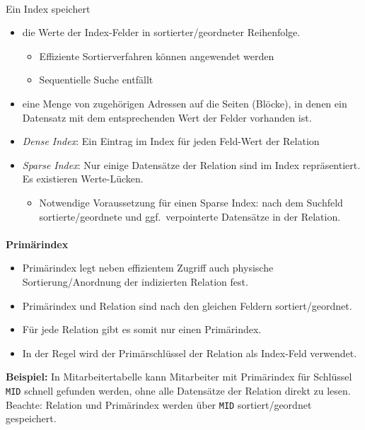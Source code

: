 \begin{frame}[label=sparsedense]{\insertsection}
\framesubtitle{\insertsubsection}
\abs
Ein Index speichert
\begin{itemize}
	\item die Werte der Index-Felder in sortierter/geordneter Reihenfolge.
	\begin{itemize}
		\item Effiziente Sortierverfahren können angewendet werden
		\item Sequentielle Suche entfällt
	\end{itemize}
	\item eine Menge von zugeh\"origen Adressen auf die Seiten (Bl\"ocke), in denen ein Datensatz mit dem entsprechenden Wert 
	der Felder vorhanden ist. 
\end{itemize}
\pause
{}
\begin{itemize}
	\item \textit{Dense Index}: Ein Eintrag im Index f\"ur jeden Feld-Wert der Relation
	\item \textit{Sparse Index}: Nur einige Datens\"atze der Relation sind im Index repr\"asentiert. Es existieren Werte-L\"ucken. 
	\begin{itemize}
		\item Notwendige Voraussetzung für einen Sparse Index: nach dem Suchfeld sortierte/geordnete und ggf.~verpointerte Datens\"atze in der
		Relation.
	\end{itemize}
\end{itemize}
\end{frame}

\begin{frame}{\insertsection}
\framesubtitle{\insertsubsection}	
\abs
\textbf{Prim\"arindex}
\begin{itemize}
	\item Prim\"arindex legt neben effizientem Zugriff auch physische Sortierung/Anordnung der 
	indizierten Relation fest.\\[4pt]
	\item Prim\"arindex und Relation sind nach den gleichen Feldern sortiert/geordnet.
	\item F\"ur jede Relation gibt es somit nur einen Prim\"arindex.\\[4pt]
	\item In der Regel wird der Prim\"arschl\"ussel der Relation als Index-Feld verwendet.
\end{itemize}
\pause
\abs
\textbf{Beispiel:} In Mitarbeitertabelle kann Mitarbeiter mit Prim\"arindex f\"ur Schl\"ussel
\texttt{MID} schnell gefunden werden, ohne alle Datens\"atze der Relation direkt zu lesen.	
\\[4pt]
\pause
Beachte: Relation und Prim\"arindex werden \"uber \texttt{MID} sortiert/geordnet gespeichert.
\end{frame}

